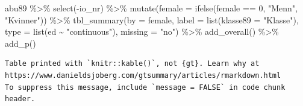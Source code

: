 \documentclass[
  letterpaper,
  DIV=11,
  numbers=noendperiod]{scrreprt}
\newenvironment{Shaded}{\begin{snugshade}}{\end{snugshade}}
\newcommand{\AttributeTok}[1]{\textcolor[rgb]{0.40,0.45,0.13}{#1}}
\newcommand{\DecValTok}[1]{\textcolor[rgb]{0.68,0.00,0.00}{#1}}
\newcommand{\FunctionTok}[1]{\textcolor[rgb]{0.28,0.35,0.67}{#1}}
\newcommand{\NormalTok}[1]{\textcolor[rgb]{0.00,0.23,0.31}{#1}}
\newcommand{\SpecialCharTok}[1]{\textcolor[rgb]{0.37,0.37,0.37}{#1}}
\newcommand{\StringTok}[1]{\textcolor[rgb]{0.13,0.47,0.30}{#1}}
\theoremstyle{definition}
\theoremstyle{remark}
\begin{document}
\begin{Shaded}
\begin{Highlighting}[]
\NormalTok{abu89 }\SpecialCharTok{\%\textgreater{}\%} 
  \FunctionTok{select}\NormalTok{(}\SpecialCharTok{{-}}\NormalTok{io\_nr) }\SpecialCharTok{\%\textgreater{}\%}
  \FunctionTok{mutate}\NormalTok{(}\AttributeTok{female =} \FunctionTok{ifelse}\NormalTok{(female }\SpecialCharTok{==} \DecValTok{0}\NormalTok{, }\StringTok{"Menn"}\NormalTok{, }\StringTok{"Kvinner"}\NormalTok{)) }\SpecialCharTok{\%\textgreater{}\%} 
    \FunctionTok{tbl\_summary}\NormalTok{(}\AttributeTok{by =}\NormalTok{ female, }
                \AttributeTok{label =} \FunctionTok{list}\NormalTok{(}\AttributeTok{klasse89 =} \StringTok{"Klasse"}\NormalTok{), }
              \AttributeTok{type =} \FunctionTok{list}\NormalTok{(ed }\SpecialCharTok{\textasciitilde{}} \StringTok{"continuous"}\NormalTok{), }
              \AttributeTok{missing =} \StringTok{"no"}\NormalTok{) }\SpecialCharTok{\%\textgreater{}\%} 
  \FunctionTok{add\_overall}\NormalTok{() }\SpecialCharTok{\%\textgreater{}\%} 
  \FunctionTok{add\_p}\NormalTok{() }
\end{Highlighting}
\end{Shaded}

\begin{verbatim}
Table printed with `knitr::kable()`, not {gt}. Learn why at
https://www.danieldsjoberg.com/gtsummary/articles/rmarkdown.html
To suppress this message, include `message = FALSE` in code chunk header.
\end{verbatim}
\end{document}
